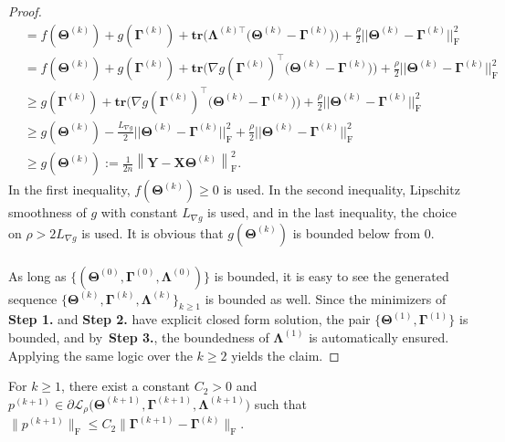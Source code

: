 \documentclass[alpha-refs]{wiley-article}
\begin{document}
\begin{proof}
\begin{align*}
    &= f(\boldsymbol{\Theta}^{(k)}) + g(\boldsymbol{\Gamma}^{(k)}) + \textbf{tr}\big( \boldsymbol{\Lambda}^{(k)\top}\big( \boldsymbol{\Theta}^{(k)} - \boldsymbol{\Gamma}^{(k)} \big)\big)
    + \frac{\rho}{2} || \boldsymbol{\Theta}^{(k)}-\boldsymbol{\Gamma}^{(k)} ||_{\text{F}}^{2} \\
    &= f(\boldsymbol{\Theta}^{(k)}) + g(\boldsymbol{\Gamma}^{(k)}) + \textbf{tr}\big( \nabla g(\boldsymbol{\Gamma}^{(k)})^\top\big( \boldsymbol{\Theta}^{(k)} - \boldsymbol{\Gamma}^{(k)} \big)\big)
    + \frac{\rho}{2} || \boldsymbol{\Theta}^{(k)}-\boldsymbol{\Gamma}^{(k)} ||_{\text{F}}^{2} \\
    &\geq g(\boldsymbol{\Gamma}^{(k)}) + \textbf{tr}\big( \nabla g(\boldsymbol{\Gamma}^{(k)})^\top\big( \boldsymbol{\Theta}^{(k)} - \boldsymbol{\Gamma}^{(k)} \big)\big)
    + \frac{\rho}{2} || \boldsymbol{\Theta}^{(k)}-\boldsymbol{\Gamma}^{(k)} ||_{\text{F}}^{2} \\
    &\geq g(\boldsymbol{\Theta}^{(k)}) -\frac{L_{\nabla g}}{2}|| \boldsymbol{\Theta}^{(k)}-\boldsymbol{\Gamma}^{(k)} ||_{\text{F}}^{2} + \frac{\rho}{2} || \boldsymbol{\Theta}^{(k)}-\boldsymbol{\Gamma}^{(k)} ||_{\text{F}}^{2} \\
    &\geq g(\boldsymbol{\Theta}^{(k)})
    :=\frac{1}{2n}\left\|\boldsymbol{Y}-\boldsymbol{X\Theta}^{(k)}\right\|_{\text{F}}^{2}.
\end{align*}
In the first inequality, $f(\boldsymbol{\Theta}^{(k)}) \geq 0$ is used. 
In the second inequality, Lipschitz smoothness of $g$ with constant $L_{\nabla g}$ is used, and in the last inequality, the choice on $\rho>2L_{\nabla g}$ is used.
It is obvious that $g(\boldsymbol{\Theta}^{(k)})$ is bounded below from $0$.
\\ \\
As long as $\{(\boldsymbol{\Theta}^{(0)},\boldsymbol{\Gamma}^{(0)},\boldsymbol{\Lambda}^{(0)})\}$ is bounded, it is easy to see the generated sequence $\{\boldsymbol{\Theta}^{(k)},\boldsymbol{\Gamma}^{(k)},\boldsymbol{\Lambda}^{(k)}\}_{k \geq 1}$ is bounded as well. 
Since the minimizers of \textbf{Step 1.} and \textbf{Step 2.} have explicit closed form solution, the pair $\{\boldsymbol{\Theta}^{(1)},\boldsymbol{\Gamma}^{(1)}\}$ is bounded, and by~\textbf{Step 3.}, the boundedness of $\boldsymbol{\Lambda}^{(1)}$ is automatically ensured.
Applying the same logic over the $k \geq 2$ yields the claim.
\end{proof}

\newpage
\begin{lemma} \label{Lemma2.4}
For $k\geq 1$, there exist a constant $C_{2}>0$ and $p^{(k+1)}\in\partial \mathcal{L}_{\rho} \big( \boldsymbol{\Theta}^{(k+1)},\boldsymbol{\Gamma}^{(k+1)},\boldsymbol{\Lambda}^{(k+1)} \big)$ such that $\|p^{(k+1)}\|_{\text{F}}\leq C_{2} \| \boldsymbol{\Gamma}^{(k+1)} - \boldsymbol{\Gamma}^{(k)} \|_{\text{F}}$.
\end{lemma}
\end{document}
